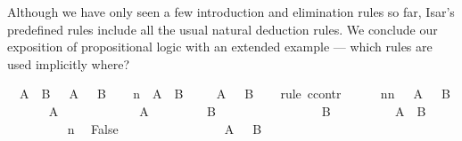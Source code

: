 \begin{isabellebody}
\begin{isamarkuptext}
Although we have only seen a few introduction and elimination rules so
far, Isar's predefined rules include all the usual natural deduction
rules. We conclude our exposition of propositional logic with an extended
example --- which rules are used implicitly where?%
\end{isamarkuptext}%
\isamarkuptrue%
\isamarkupfalse%
\ {\isachardoublequoteopen}{\isasymnot}\ {\isacharparenleft}A\ {\isasymand}\ B{\isacharparenright}\ {\isasymlongrightarrow}\ {\isasymnot}\ A\ {\isasymor}\ {\isasymnot}\ B{\isachardoublequoteclose}\isanewline
%
\isadelimproof
%
\endisadelimproof
%
\isatagproof
{}\isamarkupfalse%
\isanewline
\ \ \isamarkupfalse%
\ n{\isacharcolon}\ {\isachardoublequoteopen}{\isasymnot}\ {\isacharparenleft}A\ {\isasymand}\ B{\isacharparenright}{\isachardoublequoteclose}\isanewline
\ \ \isamarkupfalse%
\ {\isachardoublequoteopen}{\isasymnot}\ A\ {\isasymor}\ {\isasymnot}\ B{\isachardoublequoteclose}\isanewline
\ \ \isamarkupfalse%
\ {\isacharparenleft}rule\ ccontr{\isacharparenright}\isanewline
\ \ \ \ \isamarkupfalse%
\ nn{\isacharcolon}\ {\isachardoublequoteopen}{\isasymnot}\ {\isacharparenleft}{\isasymnot}\ A\ {\isasymor}\ {\isasymnot}\ B{\isacharparenright}{\isachardoublequoteclose}\isanewline
\ \ \ \ \isamarkupfalse%
\ {\isachardoublequoteopen}{\isasymnot}\ A{\isachardoublequoteclose}\isanewline
\ \ \ \ \isamarkupfalse%
\isanewline
\ \ \ \ \ \ \isamarkupfalse%
\ {\isachardoublequoteopen}A{\isachardoublequoteclose}\isanewline
\ \ \ \ \ \ \isamarkupfalse%
\ {\isachardoublequoteopen}{\isasymnot}\ B{\isachardoublequoteclose}\isanewline
\ \ \ \ \ \ \isamarkupfalse%
\isanewline
\ \ \ \ \ \ \ \ \isamarkupfalse%
\ {\isachardoublequoteopen}B{\isachardoublequoteclose}\isanewline
\ \ \ \ \ \ \ \ \isamarkupfalse%
\ {\isachardoublequoteopen}A\ {\isasymand}\ B{\isachardoublequoteclose}\ \isacommand{{\isachardot}{\isachardot}}\isamarkupfalse%
\isanewline
\ \ \ \ \ \ \ \ \isamarkupfalse%
\ n\ \isamarkupfalse%
\ False\ \isacommand{{\isachardot}{\isachardot}}\isamarkupfalse%
\isanewline
\ \ \ \ \ \ \isamarkupfalse%
\isanewline
\ \ \ \ \ \ \isamarkupfalse%
\ {\isachardoublequoteopen}{\isasymnot}\ A\ {\isasymor}\ {\isasymnot}\ B{\isachardoublequoteclose}\ \isacommand{{\isachardot}{\isachardot}}\isamarkupfalse%
\isanewline
\ \ \ \ \ \ \isamarkupfalse%

\end{isabellebody}
